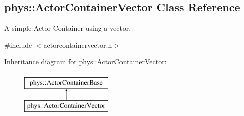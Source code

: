 \hypertarget{classphys_1_1ActorContainerVector}{
\subsection{phys::ActorContainerVector Class Reference}
\label{d3/d64/classphys_1_1ActorContainerVector}
}


A simple Actor Container using a vector.  




{\ttfamily \#include $<$actorcontainervector.h$>$}

Inheritance diagram for phys::ActorContainerVector:\begin{figure}[H]
\begin{center}
\leavevmode
\includegraphics[height=2.000000cm]{d3/d64/classphys_1_1ActorContainerVector}
\end{center}
\end{figure}

